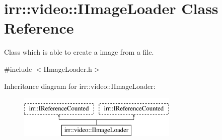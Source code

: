 \hypertarget{classirr_1_1video_1_1IImageLoader}{}\section{irr\+:\+:video\+:\+:I\+Image\+Loader Class Reference}
\label{classirr_1_1video_1_1IImageLoader}


Class which is able to create a image from a file.  




{\ttfamily \#include $<$I\+Image\+Loader.\+h$>$}

Inheritance diagram for irr\+:\+:video\+:\+:I\+Image\+Loader\+:\begin{figure}[H]
\begin{center}
\leavevmode
\includegraphics[height=2.000000cm]{classirr_1_1video_1_1IImageLoader}
\end{center}
\end{figure}
